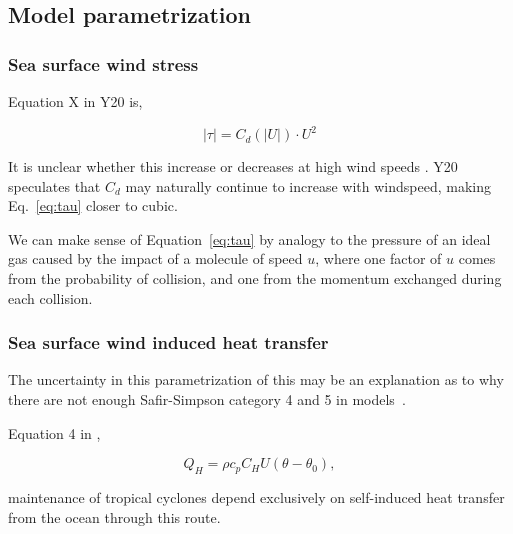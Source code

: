 \subsection{Model parametrization}
\label{sec:param}
\subsubsection{Sea surface wind stress}


Equation X in Y20 is,

\begin{equation}
 |\tau| = C_d(|U|) \cdot U^2
 \label{eq:tau}
 \end{equation}

 It is unclear whether this increase or decreases at high wind speeds
 \cite{powell2003reduced, donelan2004limiting}. Y20~\cite{ZannaPreprint} speculates that $C_d$ may naturally continue
to increase with windspeed, making Eq.~\ref{eq:tau} closer to cubic.

We can make sense of Equation~\ref{eq:tau} by analogy to the pressure of an ideal
gas caused by the impact of a molecule of speed $u$, where one factor of
$u$ comes from the probability of collision, and one from the momentum
exchanged during each collision.

\subsubsection{Sea surface wind induced heat transfer}
The uncertainty in this parametrization of this may be an explanation as to why there are
not enough Safir-Simpson category 4 and 5 in models~\cite{emanuel2005divine}.



Equation 4 in \cite{zou2017observation},

\begin{equation}
Q_{H}=\rho c_{p} C_{H} U\left(\theta-\theta_{0}\right),
\end{equation}


maintenance of tropical cyclones depend exclusively
 on self-induced heat transfer from the ocean through this route.
